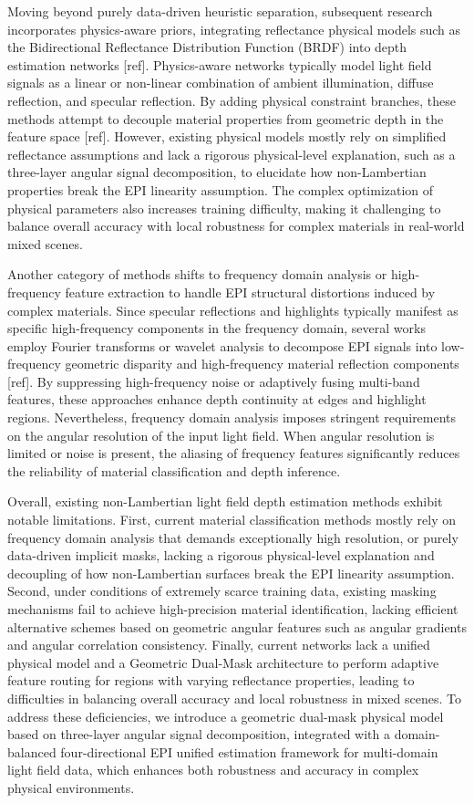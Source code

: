 \documentclass[lettersize,journal]{IEEEtran}
\begin{document}
Moving beyond purely data-driven heuristic separation, subsequent research incorporates physics-aware priors, integrating reflectance physical models such as the Bidirectional Reflectance Distribution Function (BRDF) into depth estimation networks [ref]. Physics-aware networks typically model light field signals as a linear or non-linear combination of ambient illumination, diffuse reflection, and specular reflection. By adding physical constraint branches, these methods attempt to decouple material properties from geometric depth in the feature space [ref]. However, existing physical models mostly rely on simplified reflectance assumptions and lack a rigorous physical-level explanation, such as a three-layer angular signal decomposition, to elucidate how non-Lambertian properties break the EPI linearity assumption. The complex optimization of physical parameters also increases training difficulty, making it challenging to balance overall accuracy with local robustness for complex materials in real-world mixed scenes.

Another category of methods shifts to frequency domain analysis or high-frequency feature extraction to handle EPI structural distortions induced by complex materials. Since specular reflections and highlights typically manifest as specific high-frequency components in the frequency domain, several works employ Fourier transforms or wavelet analysis to decompose EPI signals into low-frequency geometric disparity and high-frequency material reflection components [ref]. By suppressing high-frequency noise or adaptively fusing multi-band features, these approaches enhance depth continuity at edges and highlight regions. Nevertheless, frequency domain analysis imposes stringent requirements on the angular resolution of the input light field. When angular resolution is limited or noise is present, the aliasing of frequency features significantly reduces the reliability of material classification and depth inference.

Overall, existing non-Lambertian light field depth estimation methods exhibit notable limitations. First, current material classification methods mostly rely on frequency domain analysis that demands exceptionally high resolution, or purely data-driven implicit masks, lacking a rigorous physical-level explanation and decoupling of how non-Lambertian surfaces break the EPI linearity assumption. Second, under conditions of extremely scarce training data, existing masking mechanisms fail to achieve high-precision material identification, lacking efficient alternative schemes based on geometric angular features such as angular gradients and angular correlation consistency. Finally, current networks lack a unified physical model and a Geometric Dual-Mask architecture to perform adaptive feature routing for regions with varying reflectance properties, leading to difficulties in balancing overall accuracy and local robustness in mixed scenes. To address these deficiencies, we introduce a geometric dual-mask physical model based on three-layer angular signal decomposition, integrated with a domain-balanced four-directional EPI unified estimation framework for multi-domain light field data, which enhances both robustness and accuracy in complex physical environments.
\end{document}
